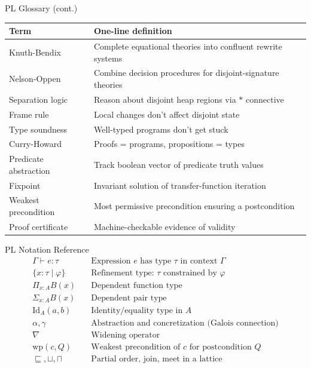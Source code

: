 \documentclass[aspectratio=169,10pt]{beamer}
\begin{document}
\begin{frame}{PL Glossary (cont.)}
\footnotesize
\renewcommand{\arraystretch}{1.2}
\begin{tabular}{@{}lp{9cm}@{}}
\toprule
\textbf{Term} & \textbf{One-line definition} \\
\midrule
Knuth-Bendix & Complete equational theories into confluent rewrite systems \\
Nelson-Oppen & Combine decision procedures for disjoint-signature theories \\
Separation logic & Reason about disjoint heap regions via $*$ connective \\
Frame rule & Local changes don't affect disjoint state \\
Type soundness & Well-typed programs don't get stuck \\
Curry-Howard & Proofs = programs, propositions = types \\
Predicate abstraction & Track boolean vector of predicate truth values \\
Fixpoint & Invariant solution of transfer-function iteration \\
Weakest precondition & Most permissive precondition ensuring a postcondition \\
Proof certificate & Machine-checkable evidence of validity \\
\bottomrule
\end{tabular}
\end{frame}

\begin{frame}{PL Notation Reference}
\begin{align*}
\Gamma \vdash e : \tau &\quad\text{Expression $e$ has type $\tau$ in context $\Gamma$} \\
\{x:\tau \mid \varphi\} &\quad\text{Refinement type: $\tau$ constrained by $\varphi$} \\
\Pi_{x:A} B(x) &\quad\text{Dependent function type} \\
\Sigma_{x:A} B(x) &\quad\text{Dependent pair type} \\
\mathrm{Id}_A(a,b) &\quad\text{Identity/equality type in $A$} \\
\alpha, \gamma &\quad\text{Abstraction and concretization (Galois connection)} \\
\nabla &\quad\text{Widening operator} \\
\text{wp}(c, Q) &\quad\text{Weakest precondition of $c$ for postcondition $Q$} \\
\sqsubseteq, \sqcup, \sqcap &\quad\text{Partial order, join, meet in a lattice}
\end{align*}
\end{frame}
\end{document}
